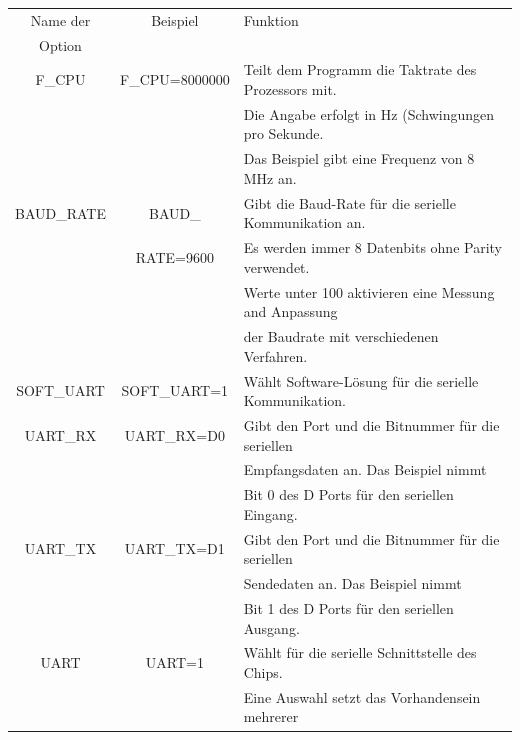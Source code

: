\begin{table}[H]
  \begin{center}
    \begin{tabular}{| c | c | l |}
    \hline
   Name der        & Beispiel       & Funktion                                            \\
    Option         &                &                                                     \\
    \hline
    \hline
    F\_CPU         & F\_CPU=8000000 & Teilt dem Programm die Taktrate des Prozessors mit. \\
                   &                & Die Angabe erfolgt in Hz (Schwingungen pro Sekunde. \\
                   &                & Das Beispiel gibt eine Frequenz von 8 MHz an. \\
    \hline
    BAUD\_RATE     & BAUD\_         & Gibt die Baud-Rate für die serielle Kommunikation an. \\
                   &  RATE=9600      & Es werden immer 8 Datenbits ohne Parity verwendet. \\
                   &                & Werte unter 100 aktivieren eine Messung and Anpassung \\
                   &                & der Baudrate mit verschiedenen Verfahren.  \\
    \hline
    SOFT\_UART     & SOFT\_UART=1   & Wählt Software-Lösung für die serielle Kommunikation. \\
    \hline
    UART\_RX        & UART\_RX=D0   & Gibt den Port und die Bitnummer für die seriellen  \\
                   &                & Empfangsdaten an. Das Beispiel nimmt               \\
                   &                & Bit 0 des D Ports für den seriellen Eingang.\\
    \hline
    UART\_TX        & UART\_TX=D1   & Gibt den Port und die Bitnummer für die seriellen  \\
                   &                & Sendedaten an.  Das Beispiel nimmt                 \\
                   &                & Bit 1 des D Ports für den seriellen Ausgang.\\
    \hline
    UART           & UART=1         & Wählt für die  serielle Schnittstelle des Chips. \\
                   &                & Eine Auswahl setzt das Vorhandensein mehrerer \\

\end{tabular}
\end{center}
\end{table}
